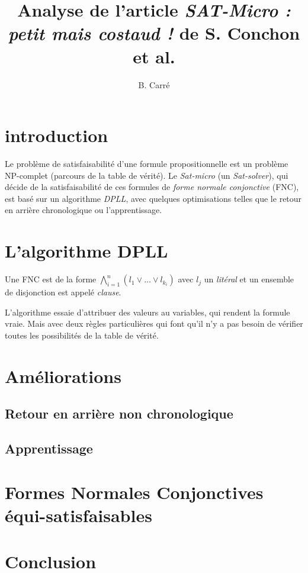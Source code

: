 \documentclass[a4paper, 10pt]{report}
\title{Analyse de l'article \emph{SAT-Micro : petit mais costaud !} de
  S. Conchon et al.}
\author{B. Carré}
\begin{document}
\maketitle


\section*{introduction}
Le problème de satisfaisabilité d'une formule propositionnelle est un
problème NP-complet (parcours de la table de vérité).
Le \emph{Sat-micro} (un \emph{Sat-solver}), qui décide de la
satisfaisabilité de ces formules de \emph{forme normale conjonctive}
(FNC), est basé sur un algorithme \emph{DPLL}, avec quelques
optimisations telles que le retour en arrière chronologique ou
l'apprentissage.

\section{L'algorithme DPLL}
Une FNC est de la forme $\bigwedge^n_{i=1}(l_1\vee\ldots\vee l_{k_i})$
avec $l_j$ un \emph{litéral} et un ensemble de disjonction est appelé \emph{clause}.

L'algorithme essaie d'attribuer des valeurs au variables, qui rendent
la formule vraie. Mais avec deux règles particulières qui font qu'il
n'y a pas besoin de vérifier toutes les possibilités de la table de vérité.

\section{Améliorations}
\subsection{Retour en arrière non chronologique}


\subsection{Apprentissage}

\section{Formes Normales Conjonctives équi-satisfaisables}

\section*{Conclusion}
\end{document}
